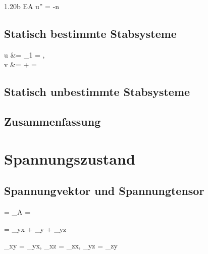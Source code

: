 \documentclass[11pt]{article}
\newcommand{\1}{ {\mathds{1}} }
\newcommand{\abs}[1]{\lvert#1\rvert}
\begin{document}
\begin{multicols*}{3}
		\begin{formel}{1.20b}
			EA u''
			=
			-n
		\end{formel}

		\subsection{Statisch bestimmte Stabsysteme}

		\begin{formel}{1.21}
			u
			&=
			\abs{\Delta\ell_1}
			=
			,\\
			v
			&=
			+
			=
		\end{formel}

		\subsection{Statisch unbestimmte Stabsysteme}

		\subsection{Zusammenfassung}

		\section{Spannungszustand}
		\subsection{Spannungvektor und Spannungtensor}

		\begin{formel}{2.1}
			=
			\lim_{\Delta A }
			=
		\end{formel}

		\begin{formel}{2.2}
			=
			\tau_{yx} 
			+
			\sigma_y	
			+
			\tau_{yz} 
		\end{formel}

		\begin{formel}{2.3}
			\tau_{xy} = \tau_{yx},
			\tau_{xz} = \tau_{zx},
			\tau_{yz} = \tau_{zy}
		\end{formel}


\end{multicols*}
\end{document}
